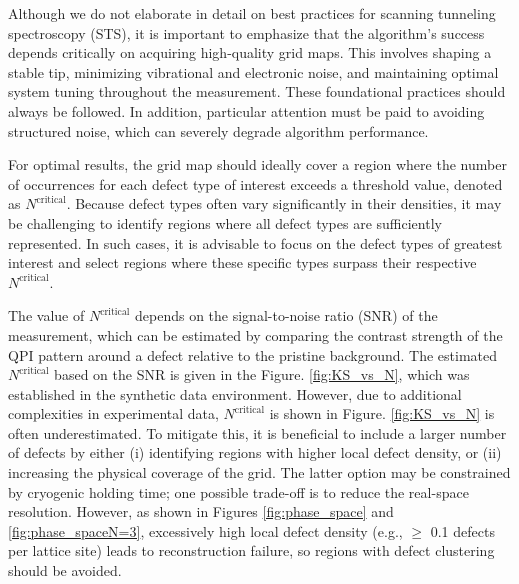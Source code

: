 Although we do not elaborate in detail on best practices for scanning tunneling spectroscopy (STS), it is important to emphasize that the algorithm’s success depends critically on acquiring high-quality grid maps. This involves shaping a stable tip, minimizing vibrational and electronic noise, and maintaining optimal system tuning throughout the measurement. These foundational practices should always be followed. In addition, particular attention must be paid to avoiding structured noise, which can severely degrade algorithm performance.

For optimal results, the grid map should ideally cover a region where the number of occurrences for each defect type of interest exceeds a threshold value, denoted as $N^{\text{critical}}$. Because defect types often vary significantly in their densities, it may be challenging to identify regions where all defect types are sufficiently represented. In such cases, it is advisable to focus on the defect types of greatest interest and select regions where these specific types surpass their respective $N^{\text{critical}}$.

The value of $N^{\text{critical}}$ depends on the signal-to-noise ratio (SNR) of the measurement, which can be estimated by comparing the contrast strength of the QPI pattern around a defect relative to the pristine background. The estimated $N^{\text{critical}}$ based on the SNR is given in the Figure. \ref{fig:KS_vs_N}, which was established in the synthetic data environment. However, due to additional complexities in experimental data, $N^{\text{critical}}$ is shown in Figure. \ref{fig:KS_vs_N} is often underestimated. To mitigate this, it is beneficial to include a larger number of defects by either (i) identifying regions with higher local defect density, or (ii) increasing the physical coverage of the grid. The latter option may be constrained by cryogenic holding time; one possible trade-off is to reduce the real-space resolution. However, as shown in Figures \ref{fig:phase_space} and \ref{fig:phase_spaceN=3}, excessively high local defect density (e.g., $\geq$ 0.1 defects per lattice site) leads to reconstruction failure, so regions with defect clustering should be avoided.

